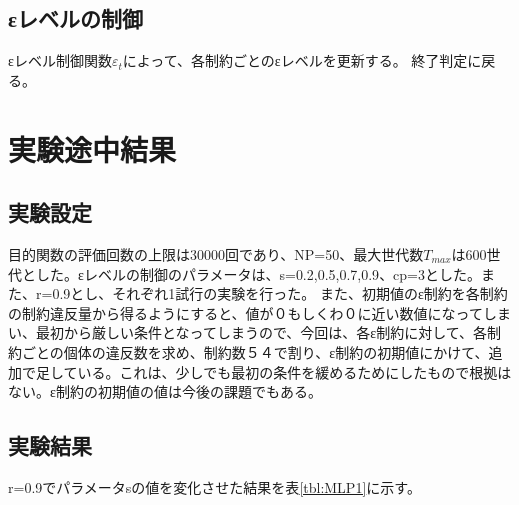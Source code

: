 \documentclass[twocolumn,10pt]{jarticle}
\begin{document}
\subsection{εレベルの制御}
εレベル制御関数${ε}_t$によって、各制約ごとのεレベルを更新する。
終了判定に戻る。

\section{実験途中結果}
\subsection{実験設定}
目的関数の評価回数の上限は30000回であり、NP=50、最大世代数${T}_{max}$は600世代とした。εレベルの制御のパラメータは、s={0.2,0.5,0.7,0.9}、cp=3とした。また、r=0.9とし、それぞれ1試行の実験を行った。
また、初期値のε制約を各制約の制約違反量から得るようにすると、値が０もしくわ０に近い数値になってしまい、最初から厳しい条件となってしまうので、今回は、各ε制約に対して、各制約ごとの個体の違反数を求め、制約数５４で割り、ε制約の初期値にかけて、追加で足している。これは、少しでも最初の条件を緩めるためにしたもので根拠はない。ε制約の初期値の値は今後の課題でもある。
\subsection{実験結果}
r=0.9でパラメータsの値を変化させた結果を表\ref{tbl:MLP1}に示す。
\end{document}
